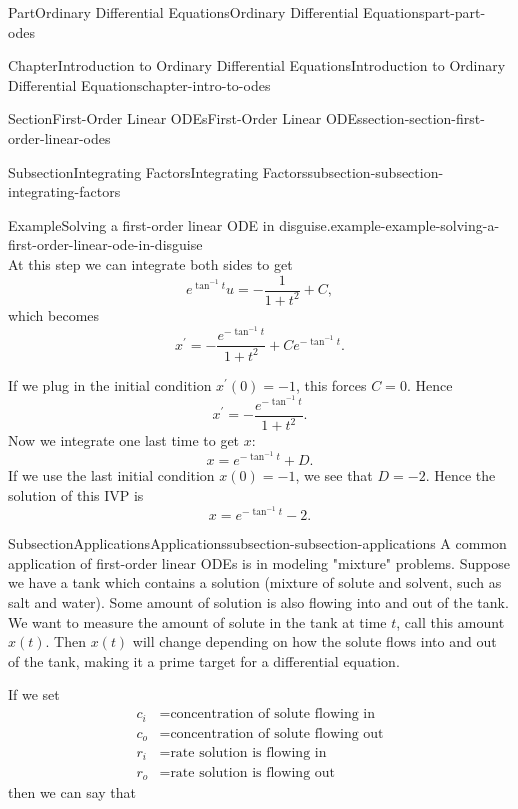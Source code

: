 \documentclass[twoside,10pt,]{book}
\numberwithin{equation}{part}
\begin{document}
\begin{partptx}{Part}{Ordinary Differential Equations}{}{Ordinary Differential Equations}{}{}{part-part-odes}
\begin{chapterptx}{Chapter}{Introduction to Ordinary Differential Equations}{}{Introduction to Ordinary Differential Equations}{}{}{chapter-intro-to-odes}
\begin{sectionptx}{Section}{First-Order Linear ODEs}{}{First-Order Linear ODEs}{}{}{section-section-first-order-linear-odes}
\begin{subsectionptx}{Subsection}{Integrating Factors}{}{Integrating Factors}{}{}{subsection-subsection-integrating-factors}
\begin{example}{Example}{Solving a first-order linear ODE in disguise.}{example-example-solving-a-first-order-linear-ode-in-disguise}
\begin{equation*}
\end{equation*}
At this step we can integrate both sides to get%
\begin{equation*}
e^{\tan^{-1}t}u = -\frac{1}{1+t^{2}}+C,
\end{equation*}
which becomes%
\begin{equation*}
x^\prime = -\frac{e^{-\tan^{-1}t}}{1+t^{2}}+Ce^{-\tan^{-1}t}.
\end{equation*}
%
\par
If we plug in the initial condition \(x^\prime (0) = -1\), this forces \(C=0\). Hence%
\begin{equation*}
x^\prime = -\frac{e^{-\tan^{-1}t}}{1+t^{2}}.
\end{equation*}
Now we integrate one last time to get \(x\):%
\begin{equation*}
x = e^{-\tan^{-1}t}+D.
\end{equation*}
If we use the last initial condition \(x(0)=-1\), we see that \(D = -2\). Hence the solution of this IVP is%
\begin{equation*}
x = e^{-\tan^{-1}t}-2.
\end{equation*}
%
\end{example}
\end{subsectionptx}
%
%
\typeout{************************************************}
\typeout{************************************************}
%
\begin{subsectionptx}{Subsection}{Applications}{}{Applications}{}{}{subsection-subsection-applications}
A common application of first-order linear ODEs is in modeling "mixture" problems. Suppose we have a tank which contains a solution (mixture of solute and solvent, such as salt and water). Some amount of solution is also flowing into and out of the tank. We want to measure the amount of solute in the tank at time \(t\), call this amount \(x(t)\). Then \(x(t)\) will change depending on how the solute flows into and out of the tank, making it a prime target for a differential equation.%
\par
If we set%
\begin{align*}
c_{i} & =\text{concentration of solute flowing in} \\
c_{o} & =\text{concentration of solute flowing out} \\
r_{i} & =\text{rate solution is flowing in} \\
r_{o} & = \text{rate solution is flowing out} 
\end{align*}
then we can say that%
\begin{equation*}

\end{equation*}
\end{subsectionptx}
\end{sectionptx}
\end{chapterptx}
\end{partptx}
\end{document}
